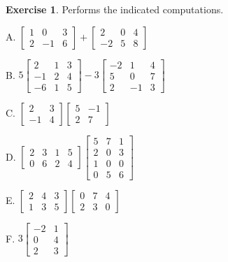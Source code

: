 \documentclass[
]{book}
\theoremstyle{definition}
\theoremstyle{definition}
\theoremstyle{definition}
\newtheorem{exercise}{Exercise}[chapter]
\theoremstyle{definition}
\theoremstyle{remark}
\begin{document}
\begin{exercise}
\protect\hypertarget{exr:unnamed-chunk-1}{}\label{exr:unnamed-chunk-1}Performs the indicated computations.

A. \(\begin{bmatrix}
1 & 0 & 3 \\
2 & -1 & 6
\end{bmatrix}+
\begin{bmatrix}
2 & 0 & 4 \\
-2 & 5 & 8
\end{bmatrix}\)

B. \(5 \begin{bmatrix}
2 & 1 & 3 \\
-1 & 2 & 4 \\
-6 &1 & 5
\end{bmatrix}
-3 \begin{bmatrix}
-2 & 1 & 4 \\
5 & 0 & 7\\
2 & -1 &3
\end{bmatrix}\)

C. \(\begin{bmatrix} 2 & 3 \\ -1 & 4 \end{bmatrix}
   \begin{bmatrix} 5 & -1 \\ 2 & 7 \end{bmatrix}\)

D. \(\begin{bmatrix} 2 & 3 & 1 & 5 \\ 0 & 6 & 2 & 4 \end{bmatrix}  \begin{bmatrix} 5 & 7 & 1 \\ 2 & 0 & 3 \\ 1 & 0 & 0 \\ 0 & 5 & 6 \end{bmatrix}\)

E. \(\begin{bmatrix} 2 & 4 & 3 \\ 1 & 3 & 5 \end{bmatrix}
\begin{bmatrix} 0 & 7 & 4 \\ 2 & 3 & 0 \end{bmatrix}\)

F. \(3 \begin{bmatrix} -2 & 1 \\ 0 & 4 \\ 2 & 3 \end{bmatrix}\)


\end{exercise}
\end{document}
